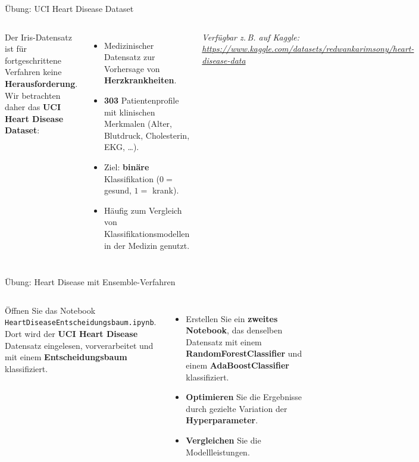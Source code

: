 \begin{frame}{Übung: UCI Heart Disease Dataset}
\begin{columns}
\centering
{}

\footnotesize
Der Iris-Datensatz ist für fortgeschrittene Verfahren keine
\textbf{Herausforderung}. Wir betrachten daher das \textbf{UCI Heart
Disease Dataset}:

\vspace{0.4em}
\begin{itemize}
  \item Medizinischer Datensatz zur Vorhersage von \textbf{Herzkrankheiten}.
  \item \textbf{303} Patientenprofile mit klinischen Merkmalen (Alter,
        Blutdruck, Cholesterin, EKG, \dots).
  \item Ziel: \textbf{binäre} Klassifikation
        ($0 =$ gesund, $1 =$ krank).
  \item Häufig zum Vergleich von Klassifikationsmodellen in der Medizin
        genutzt.
\end{itemize}

\vspace{0.3em}
{\scriptsize\itshape Verfügbar z.\,B. auf Kaggle:
\url{https://www.kaggle.com/datasets/redwankarimsony/heart-disease-data}}
\end{columns}
\end{frame}

\begin{frame}{Übung: Heart Disease mit Ensemble-Verfahren}
\begin{columns}
Öffnen Sie das Notebook \texttt{HeartDiseaseEntscheidungsbaum.ipynb}.
Dort wird der \textbf{UCI Heart Disease} Datensatz eingelesen,
vorverarbeitet und mit einem \textbf{Entscheidungsbaum} klassifiziert.

\vspace{0.4em}
\begin{itemize}
  \item Erstellen Sie ein \textbf{zweites Notebook}, das denselben Datensatz
        mit einem \textbf{RandomForestClassifier} und einem
        \textbf{AdaBoostClassifier} klassifiziert.
  \item \textbf{Optimieren} Sie die Ergebnisse durch gezielte Variation der
        \textbf{Hyperparameter}.
  \item \textbf{Vergleichen} Sie die Modellleistungen.
\end{itemize}

\centering
{}
\end{columns}
\end{frame}

\makequestionspage{\FRAGENIMAGE}